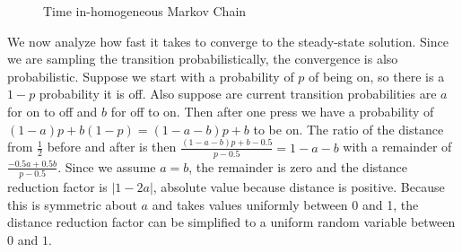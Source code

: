 \documentclass[11pt, oneside]{article}
\begin{document}
\begin{figure}[h!]
  \centering
  \caption{Time in-homogeneous Markov Chain}
\end{figure}

We now analyze how fast it takes to converge to the steady-state solution.
Since we are sampling the transition probabilistically, the convergence is
also probabilistic. Suppose we start with a probability of \( p \) of being on,
so there is a \( 1 - p \) probability it is off. Also suppose are current 
transition probabilities are \( a \) for on to off and \( b \) for off to on.
Then after one press we have a probability of
\( (1 - a)p + b(1 - p) = (1 - a - b)p + b \) to be on. The ratio of the
distance from \( \frac{1}{2} \) before and after is then
\( \frac{(1 - a - b)p + b - 0.5}{p - 0.5} = 1 - a - b \)
with a remainder of \( \frac{-0.5a + 0.5b}{p - 0.5} \). Since we assume
\( a = b \), the remainder is zero and the distance reduction factor is 
\( |1 - 2a| \), absolute value because distance is positive. Because this is
symmetric about \( a \) and takes values uniformly between 0 and 1,
the distance reduction factor can be simplified to a
uniform random variable between \( 0 \) and \( 1 \).
\end{document}
